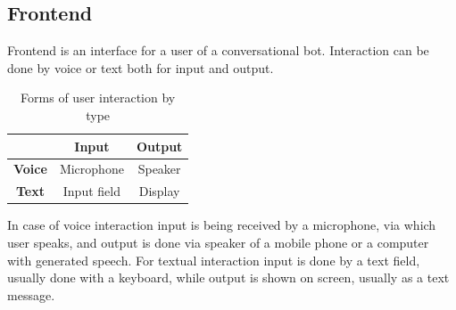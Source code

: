 \subsection{Frontend}

Frontend is an interface for a user of a conversational bot.
Interaction can be done by voice or text both for input and output.

\begin{table}
    \centering
    \caption{Forms of user interaction by type}
    \begin{tabular}{|c|c|c|}
        \hline
        & \textbf{Input} & \textbf{Output} \\
        \hline
        \textbf{Voice} & Microphone & Speaker \\
        \hline
        \textbf{Text} & Input field & Display \\
        \hline
    \end{tabular}
    \medskip
\end{table}

In case of voice interaction input is being received by a microphone, via which user speaks, and output is done via speaker of a mobile phone or a computer with generated speech.
For textual interaction input is done by a text field, usually done with a keyboard, while output is shown on screen, usually as a text message.

